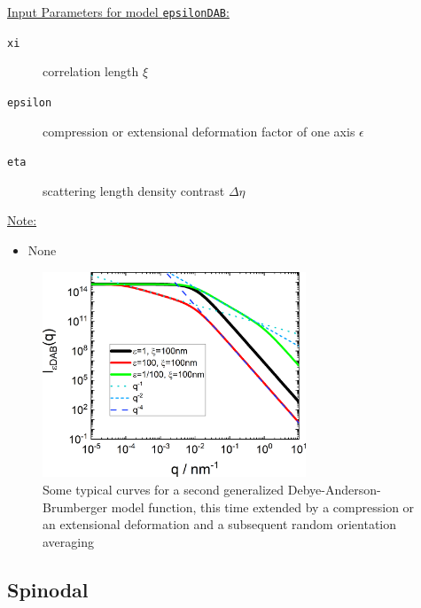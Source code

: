 \vspace{5mm}


\uline{Input Parameters for model \texttt{epsilonDAB}:}
\begin{description}
\item[\texttt{xi}] correlation length $\xi$
\item[\texttt{epsilon}] compression or extensional deformation factor of one axis $\epsilon$
\item[\texttt{eta}] scattering length density contrast $\Delta\eta$
\end{description}

\uline{Note:}
\begin{itemize}
\item None
\end{itemize}


\begin{figure}[htb]
\begin{center}
\includegraphics[width=0.7\textwidth]{../images/form_factor/nonparticular/epsilonDAB.png}
\end{center}
\caption{Some typical curves for a second generalized Debye-Anderson-Brumberger model function, this time extended by a compression or an extensional deformation and a subsequent random orientation averaging } \label{fig:spsilonDABIq}
\end{figure}

\clearpage
\subsection{Spinodal}
\label{sect:Spinodal}
~\\

